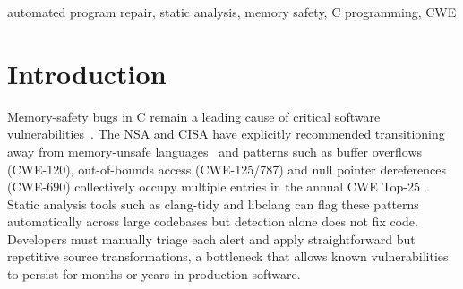 \documentclass[conference]{IEEEtran}
\begin{document}
\begin{abstract}
Buffer overflows, null pointer dereferences and improper memory management are
among the most exploited vulnerability classes in C software. Static analysis tools
can detect these patterns at scale but remediation remains a manual, per-alert
process. This paper presents SafeRepair, a rule-based automated program repair tool that
ingests static analysis alerts, confirms each vulnerability structurally against
the libclang abstract syntax tree and applies a deterministic source transformation.
Every patch is then validated with GCC compilation before being written. SafeRepair targets four CWE
patterns: suspicious realloc usage (CWE-401/690), missing null checks (CWE-690),
index-before-bounds-check (CWE-125/787) and unbounded sprintf (CWE-120). Evaluated
on 372 real-world alerts across 15 production open-source repositories spanning
editors, databases, game engines and network daemons, SafeRepair achieves 99.7\% repair accuracy on confirmed alerts with zero false positives. Requiring no training
data and producing deterministic output, SafeRepair is designed for deployment in
automated CI/CD pipelines where patch correctness cannot depend on human review.
\end{abstract}

\begin{IEEEkeywords}
automated program repair, static analysis, memory safety, C programming, CWE
\end{IEEEkeywords}


\section{Introduction}

Memory-safety bugs in C remain a leading cause of critical software vulnerabilities~\cite{b9}.
The NSA and CISA have explicitly recommended transitioning away from memory-unsafe
languages~\cite{b6} and patterns such as buffer overflows (CWE-120), out-of-bounds
access (CWE-125/787) and null pointer dereferences (CWE-690) collectively occupy
multiple entries in the annual CWE Top-25~\cite{b7}. Static analysis tools such as
clang-tidy and libclang can flag these patterns automatically across large codebases
but detection alone does not fix code. Developers must manually triage each alert
and apply straightforward but repetitive source transformations, a bottleneck that
allows known vulnerabilities to persist for months or years in production software.
\end{document}
